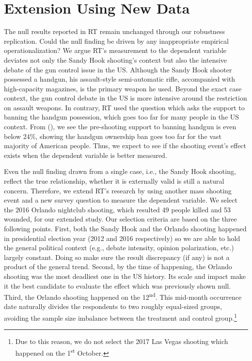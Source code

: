 \documentclass[11pt]{article}
\begin{document}


\section*{Extension Using New Data}
The null results reported in RT remain unchanged through our robustness replication. Could the null finding be driven by any inappropriate empirical operationalization? We argue RT’s measurement to the dependent variable deviates not only the Sandy Hook shooting’s context but also the intensive debate of the gun control issue in the US. Although the Sandy Hook shooter possessed a handgun, his assault-style semi-automatic rifle, accompanied with high-capacity magazines, is the primary weapon he used. Beyond the exact case context, the gun control debate in the US is more intensive around the restriction on assault weapons. In contrary, RT used the question which asks the support to banning the handgun possession, which goes too far for many people in the US context. From (), we see the pre-shooting support to banning handgun is even below 24\%, showing the handgun ownership ban goes too far for the vast majority of American people. Thus, we expect to see if the shooting event’s effect exists when the dependent variable is better measured.

Even the null finding drawn from a single case, i.e., the Sandy Hook shooting, reflect the true relationship, whether it is externally valid is still a natural concern. Therefore, we extend RT’s research by using another mass shooting event and a new survey question to measure the dependent variable. We select the 2016 Orlando nightclub shooting, which resulted 49 people killed and 53 wounded, for our extended study. Our selection criteria are based on the three following points. First, both the Sandy Hook and the Orlando shooting happened in presidential election year (2012 and 2016 respectively) so we are able to hold the general political context (e.g., debate intensity, opinion polarization, etc.) largely constant. Doing so make sure the result discrepancy (if any) is not a product of the general trend. Second, by the time of happening, the Orlando shooting was the most deadliest one in the US history. Its scale and impact make it the best candidate to evaluate the effect which was previously shown null. Third, the Orlando shooting happened on the 12\textsuperscript{nd}. This mid-month occurrence date naturally divides the respondents to two roughly equal-sized groups, avoiding the sample size imbalance between the treatment and control group.\footnote{Due to this reason, we do not select the 2017 Las Vegas shooting which happened on the 1\textsuperscript{st} October.}
\end{document}
